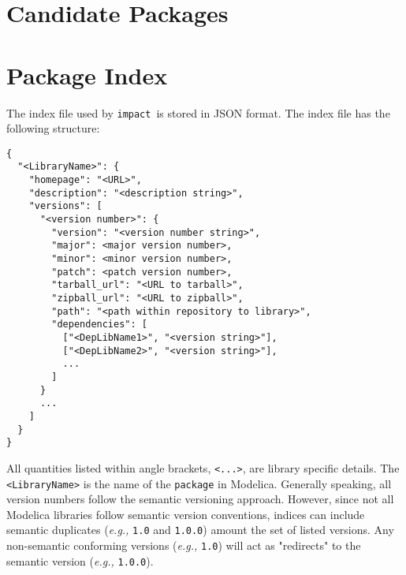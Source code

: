 \documentclass[11pt,a4paper,twocolumn]{article}
\newcommand{\impact}{\texttt{impact}} %
\newcommand{\code}[1]{\texttt{#1}} %
\begin{document}

\section{Candidate Packages}
\label{sec:candidates}





\section{Package Index}
\label{sec:index}



The index file used by \impact\ is stored in JSON format.  The index file
has the following structure:

\begin{verbatim}
{
  "<LibraryName>": {
    "homepage": "<URL>",
    "description": "<description string>",
    "versions": [
      "<version number>": {
        "version": "<version number string>",
        "major": <major version number>,
        "minor": <minor version number>,
        "patch": <patch version number>,
        "tarball_url": "<URL to tarball>",
        "zipball_url": "<URL to zipball>",
        "path": "<path within repository to library>",
        "dependencies": [
          ["<DepLibName1>", "<version string>"],
          ["<DepLibName2>", "<version string>"],
          ...
        ]
      }
      ...
    ]
  }
}
\end{verbatim}

All quantities listed within angle brackets, \code{<...>}, are library
specific details.  The \code{<LibraryName>} is the name of the \code{package} in 
Modelica.  Generally speaking, all version numbers follow the semantic versioning
approach.  However, since not all Modelica libraries follow semantic version 
conventions, indices can include semantic duplicates (\textit{e.g.,} \code{1.0} 
and \code{1.0.0}) amount the set of listed versions.  Any non-semantic conforming 
versions (\textit{e.g.,} \code{1.0}) will act as "redirects" to the semantic
version (\textit{e.g.,} \code{1.0.0}).
\end{document}
